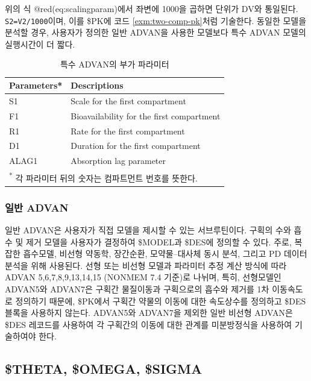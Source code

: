 \documentclass[
  10pt,
  krantz2,
  a4paper]{krantz}
\theoremstyle{definition}
\theoremstyle{definition}
\theoremstyle{definition}
\theoremstyle{remark}
\begin{document}
위의 식 @red(eq:scalingparam)에서 좌변에 1000을 곱하면 단위가 DV와 통일된다. \texttt{S2=V2/1000}이며, 이를 \$PK에 코드 \ref{exm:two-comp-pk}처럼 기술한다. 동일한 모델을 분석할 경우, 사용자가 정의한 일반 ADVAN을 사용한 모델보다 특수 ADVAN 모델의 실행시간이 더 짧다.

\begin{table}[!h]

\caption{\label{tab:advan-param}특수 ADVAN의 부가 파라미터}
\centering
\begin{tabular}[t]{ll}
\toprule
Parameters* & Descriptions\\
\midrule
\rowcolor{gray!6}  S1 & Scale for the first compartment\\
F1 & Bioavailability for the first compartment\\
\rowcolor{gray!6}  R1 & Rate for the first compartment\\
D1 & Duration for the first compartment\\
\rowcolor{gray!6}  ALAG1 & Absorption lag parameter\\
\bottomrule
\multicolumn{2}{l}{\textsuperscript{*} 각 파라미터 뒤의 숫자는 컴파트먼트 번호를 뜻한다.}\\
\end{tabular}
\end{table}

\hypertarget{uxc77cuxbc18-advan}{%
\subsubsection{일반 ADVAN}\label{uxc77cuxbc18-advan}}

일반 ADVAN은 사용자가 직접 모델을 제시할 수 있는 서브루틴이다. 구획의 수와 흡수 및 제거 모델을 사용자가 결정하여 \$MODEL과 \$DES에 정의할 수 있다. 주로, 복잡한 흡수모델, 비선형 약동학, 장간순환, 모약물--대사체 동시 분석, 그리고 PD 데이터 분석을 위해 사용된다. 선형 또는 비선형 모델과 파라미터 추정 계산 방식에 따라 ADVAN 5,6,7,8,9,13,14,15 (NONMEM 7.4 기준)로 나뉘며, 특히, 선형모델인 ADVAN5와 ADVAN7은 구획간 물질이동과 구획으로의 흡수와 제거를 1차 이동속도로 정의하기 때문에, \$PK에서 구획간 약물의 이동에 대한 속도상수를 정의하고 \$DES 블록을 사용하지 않는다. ADVAN5와 ADVAN7을 제외한 일반 비선형 ADVAN은 \$DES 레코드를 사용하여 각 구획간의 이동에 대한 관계를 미분방정식을 사용하여 기술하여야 한다.

\hypertarget{theta-omega-sigma}{%
\subsection{\$THETA, \$OMEGA, \$SIGMA}\label{theta-omega-sigma}}
\end{document}
